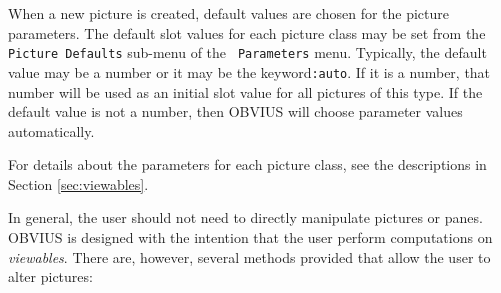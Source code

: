 When a new picture is created, default values are chosen for the
picture parameters.  The default slot values for each picture class
may be set from the {\tt Picture Defaults} sub-menu of the {\tt
Parameters} menu.  Typically, the default value may be a number or it
may be the keyword{\tt :auto}.  If it is a number, that number will be
used as an initial slot value for all pictures of this type.  If the
default value is not a number, then OBVIUS will choose parameter
values automatically.

For details about the parameters for each picture class, see the
descriptions in Section \ref{sec:viewables}.


In general, the user should not need to directly manipulate pictures
or panes.  OBVIUS is designed with the intention that the user perform
computations on {\em viewables}.  There are, however, several methods
provided that allow the user to alter pictures:
